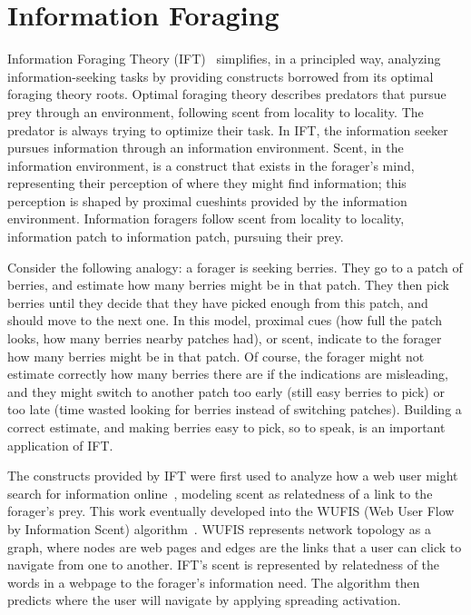 \section{Information Foraging}
Information Foraging Theory (IFT)~\cite{pirolli07} simplifies, in a principled way, analyzing information-seeking tasks by providing constructs borrowed from its optimal foraging theory roots. Optimal foraging theory describes predators that pursue prey through an environment, following scent from locality to locality. The predator is always trying to optimize their task. In IFT, the information seeker pursues information through an information environment. Scent, in the information environment, is a construct that exists in the forager's mind, representing their perception of where they might find information; this perception is shaped by proximal cues\textemdash hints provided by the information environment. Information foragers follow scent from locality to locality, information patch to information patch, pursuing their prey. 

Consider the following analogy: a forager is seeking berries. They go to a patch of berries, and estimate how many berries might be in that patch. They then pick berries until they decide that they have picked enough from this patch, and should move to the next one. In this model, proximal cues (how full the patch looks, how many berries nearby patches had), or scent, indicate to the forager how many berries might be in that patch. Of course, the forager might not estimate correctly how many berries there are if the indications are misleading, and they might switch to another patch too early (still easy berries to pick) or too late (time wasted looking for berries instead of switching patches). Building a correct estimate, and making berries easy to pick, so to speak, is an important application of IFT. 

The constructs provided by IFT were first used to analyze how a web user might search for information online~\cite{pirolliWeb}, modeling scent as relatedness of a link to the forager's prey. This work eventually developed into the WUFIS (Web User Flow by Information Scent) algorithm~\cite{wufis}. WUFIS represents network topology as a graph, where nodes are web pages and edges are the links that a user can click to navigate from one to another. IFT's scent is represented by relatedness of the words in a webpage to the forager's information need. The algorithm then predicts where the user will navigate by applying spreading activation. 

